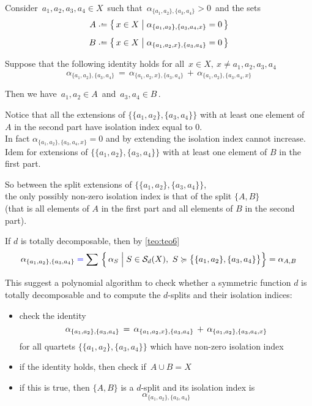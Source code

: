 \documentclass[./main.tex]{subfiles}
\begin{document}
Consider $\, a_1,a_2,a_3,a_4 \in X \,$ such that $\, \alpha_{\{a_1,a_2\},\{a_3,a_4\}} > 0 \,$ and the sets
\begin{align*}
    A &\defeq \bigl\{\, x \in X \mathrel{\big|} \alpha_{\{a_1,a_2\},\{a_3,a_4,x\}} = 0 \,\bigr\} \\[5pt]
    B &\defeq \bigl\{\, x \in X \mathrel{\big|} \alpha_{\{a_1,a_2,x\},\{a_3,a_4\}} = 0 \,\bigr\}
\end{align*}

Suppose that the following identity holds for all $\, x \in X,\ x \neq a_1,a_2,a_3,a_4 \,$
\[ \alpha_{\{a_1,a_2\},\{a_3,a_4\}} \,=\, \alpha_{\{a_1,a_2,x\},\{a_3,a_4\}} \,+\, \alpha_{\{a_1,a_2\},\{a_3,a_4,x\}} \]

Then we have $\, a_1,a_2 \in A \,$ and $\, a_3,a_4 \in B \,$.

Notice that all the extensions of $\bigl\{ \{a_1,a_2\},\{a_3,a_4\} \bigr\}$ with at least one element of $A$ in the second part have isolation index equal to 0. \\
In fact $\alpha_{\{a_1,a_2\},\{a_3,a_4,x\}} = 0$ and by extending the isolation index cannot increase. \\
Idem for extensions of $\bigl\{ \{a_1,a_2\},\{a_3,a_4\} \bigr\}$ with at least one element of $B$ in the first part.

So between the split extensions of $\bigl\{ \{a_1,a_2\},\{a_3,a_4\} \bigr\}$, \\
\bsp the only possibly non-zero isolation index is that of the split $\{A,B\}$ \\
(that is all elements of $A$ in the first part and all elements of $B$ in the second part).

If $d$ is totally decomposable, then by \autoref{teo:teo6}
\[ \alpha_{\{a_1,a_2\},\{a_3,a_4\}} \mathcolor{blue}{=} \sum\ \Bigl\{\, \alpha_S \mathrel{\Big|} S \in \Sc_d(X),\ S \succcurlyeq \bigl\{ \{a_1,a_2\},\{a_3,a_4\} \bigr\} \Bigr\} = \aAB \]

\clearpage

This suggest a polynomial algorithm to check whether a symmetric function $d$ is totally decomposable and to compute the $d$-splits and their isolation indices:
\begin{itemize}
    \item check the identity 
    \[ \alpha_{\{a_1,a_2\},\{a_3,a_4\}} \,=\, \alpha_{\{a_1,a_2,x\},\{a_3,a_4\}} \,+\, \alpha_{\{a_1,a_2\},\{a_3,a_4,x\}} \eqspace{-3pt}{2pt} \]
    for all quartets $\bigl\{ \{a_1,a_2\},\{a_3,a_4\} \bigr\}$ which have non-zero isolation index
    \item if the identity holds, then check if $\, A \cup B = X \,$
    \item if this is true, then $\{A,B\}$ is a $d$-split and its isolation index is
    \[ \alpha_{\{a_1,a_2\},\{a_3,a_4\}} \]
\end{itemize} \bigskip
\end{document}
